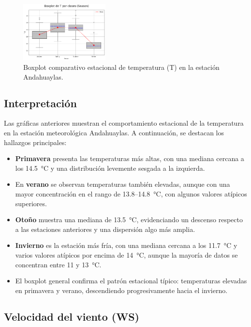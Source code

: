 \vspace{0.2cm}

\begin{figure}[H]
\centering
\includegraphics[width=0.4\textwidth]{resultados/por_estacion_del_anio/boxplot_clases_por_estacion/Andahuaylas/T_ClassBoxplot_Season.png}
\caption{Boxplot comparativo estacional de temperatura (T) en la estación Andahuaylas.}
\label{fig:andahuaylas_t_box}
\end{figure}

\subsection*{Interpretación}

Las gráficas anteriores muestran el comportamiento estacional de la temperatura en la estación meteorológica Andahuaylas. A continuación, se destacan los hallazgos principales:

\begin{itemize}
    \item \textbf{Primavera} presenta las temperaturas más altas, con una mediana cercana a los 14.5~°C y una distribución levemente sesgada a la izquierda.
    \item En \textbf{verano} se observan temperaturas también elevadas, aunque con una mayor concentración en el rango de 13.8–14.8~°C, con algunos valores atípicos superiores.
    \item \textbf{Otoño} muestra una mediana de 13.5~°C, evidenciando un descenso respecto a las estaciones anteriores y una dispersión algo más amplia.
    \item \textbf{Invierno} es la estación más fría, con una mediana cercana a los 11.7~°C y varios valores atípicos por encima de 14~°C, aunque la mayoría de datos se concentran entre 11 y 13~°C.
    \item El boxplot general confirma el patrón estacional típico: temperaturas elevadas en primavera y verano, descendiendo progresivamente hacia el invierno.
\end{itemize}



\subsection{Velocidad del viento (WS)}


